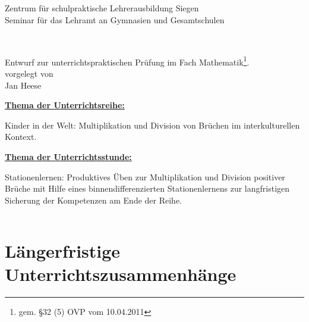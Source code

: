\documentclass[fontsize=13pt,paper=a4,DIV12,cleardoublepage=empty, 
liststotoc,idxtotoc,bibtotoc]{article}
\theoremstyle{plain}
\theoremstyle{definition}
\begin{document}
	\begin{titlepage}
		\vspace*{-3cm}
		\noindent
		\hspace*{1cm}
		\begin{minipage}{0.05\textwidth}
			\begin{figure}[H]
				\centering 
			\end{figure}
		\end{minipage}
		\begin{minipage}{0.95\textwidth}
			\begin{center}
				{\LARGE Zentrum für schulpraktische Lehrerausbildung Siegen}\\
				Seminar für das Lehramt an Gymnasien und Gesamtschulen
			\end{center}
		\end{minipage}
		\\[0.5cm]
		\begin{center}
		\Large{Entwurf zur unterrichtspraktischen Prüfung im Fach Mathematik\footnote{gem. §32 (5) OVP vom 10.04.2011}}.\\[0.5cm]
		\normalsize{vorgelegt von}\\[0.25cm]	
		\large{Jan Heese}\\[0.5cm]
		\end{center}
	\begin{flushleft}
	\hyperref[subsec:thema1]{\textbf{\large Thema der Unterrichtsreihe:}}  \\
	\end{flushleft}
	Kinder in der Welt: Multiplikation und Division von Brüchen im interkulturellen Kontext. 
	\begin{flushleft}
	\hyperref[subsec:thema2]{\textbf{\large Thema der Unterrichtsstunde:}} 
	\end{flushleft}
	Stationenlernen: Produktives Üben zur Multiplikation und Division positiver Brüche mit Hilfe eines binnendifferenzierten Stationenlernens zur langfristigen Sicherung der Kompetenzen am Ende der Reihe. 
	\quad \\[1.5cm]
	\noindent 
	\renewcommand{\arraystretch}{1.4}
	\begin{tabular}{|l r|}
	\hline
	\hline 
	\end{tabular}
	\end{titlepage}
	\newpage
	\thispagestyle{empty}
	\tableofcontents
	\newpage
	\section{Längerfristige Unterrichtszusammenhänge}
\end{document}
